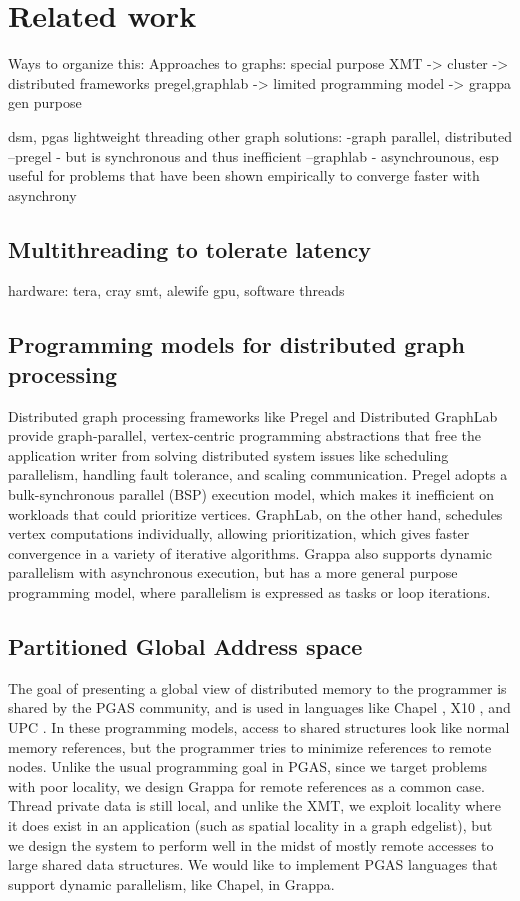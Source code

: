 \section{Related work}

Ways to organize this:
Approaches to graphs: special purpose XMT -> cluster -> distributed frameworks {pregel,graphlab} -> limited programming model -> grappa gen purpose

dsm, pgas
lightweight threading
other graph solutions: 
-graph parallel, distributed
--pregel - but is synchronous and thus inefficient
--graphlab - asynchrounous, esp useful for problems that have been shown empirically to converge faster with asynchrony

\subsection{Multithreading to tolerate latency}
hardware: tera, cray
smt,
alewife
gpu,
software threads

\subsection{Programming models for distributed graph processing}

Distributed graph processing frameworks like Pregel \cite{pregel:2010} and Distributed GraphLab \cite{distgraphlab:vldb12} provide graph-parallel, vertex-centric programming abstractions that free the application writer from solving distributed system issues like scheduling parallelism, handling fault tolerance, and scaling communication. Pregel adopts a bulk-synchronous parallel (BSP) execution model, which makes it inefficient on workloads that could prioritize vertices. GraphLab, on the other hand, schedules vertex computations individually, allowing prioritization, which gives faster convergence in a variety of iterative algorithms. Grappa also supports dynamic parallelism with asynchronous execution, but has a more general purpose programming model, where parallelism is expressed as tasks or loop iterations. 

\subsection{Partitioned Global Address space}
The goal of presenting a global view of distributed memory to the programmer is shared by the PGAS community, and is used in languages like Chapel \cite{Chapel}, X10 \cite{X10}, and UPC \cite{UPC}. In these programming models, access to shared structures look like normal memory references, but the programmer tries to minimize references to remote nodes. Unlike the usual programming goal in PGAS, since we target problems with poor locality, we design Grappa for remote references as a common case. Thread private data is still local, and unlike the XMT, we exploit locality where it does exist in an application (such as spatial locality in a graph edgelist), but we design the system to perform well in the midst of mostly remote accesses to large shared data structures. We would like to implement PGAS languages that support dynamic parallelism, like Chapel, in Grappa.
